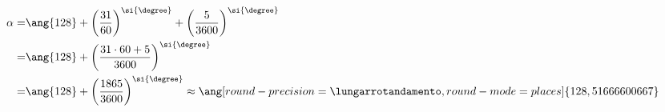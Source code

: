   	\begin{align*}
  	\alpha=&\ang{128}+\left(\dfrac{31}{60}\right)^{\si{\degree} }+\left(\dfrac{5}{3600}\right)^{\si{\degree} }\\
  	=&\ang{128}+\left(\dfrac{31\cdot60+5}{3600}\right)^{\si{\degree}}\\
  	=&\ang{128}+\left(\dfrac{1865}{3600}\right)^{\si{\degree}}\approx\ang[round-precision=\lungarrotandamento,round-mode=places]{128,51666600667}
  	\end{align*}
  
